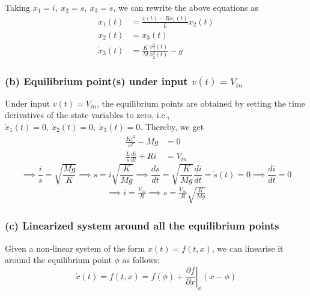 Taking \( x_1 = i, \ x_2 = s, \ x_3 = \dot s \), we can rewrite the above equations as
\begin{align*}
    \dot x_1(t) & = \frac{v(t) - R x_1(t)}{L} x_2(t)          \\
    \dot x_2(t) & = x_3(t)                                    \\
    \dot x_3(t) & = \frac{K}{M} \frac{x_1^2(t)}{x_2^2(t)} - g
\end{align*}

\subsubsection*{(b) Equilibrium point(s) under input \(v(t)=V_{in}\)}

Under input \( v(t)=V_{in} \), the equilibrium points are obtained by setting the time derivatives of the state variables to zero, i.e., \( \dot x_1(t) = 0, \ \dot x_2(t) = 0, \ \dot x_3(t) = 0 \).
Thereby, we get
\begin{align*}
    \frac{Ki^2}{s^2} - Mg         & = 0      \\
    \frac{L}{s}\frac{di}{dt} + Ri & = V_{in}
\end{align*}
\begin{equation*}
    \implies
    \frac{i}{s} = \sqrt{\frac{Mg}{K}}
    \implies
    s = i \sqrt{\frac{K}{Mg}}
    \implies
    \frac{ds}{dt} = \sqrt{\frac{K}{Mg}} \frac{di}{dt} = \dot s(t) = 0
    \implies
    \frac{di}{dt} = 0
\end{equation*}
\begin{align*}
    \implies
    i = \frac{V_{in}}{R}
    \implies
    \boxed{
        s = \frac{V_{in}}{R} \sqrt{\frac{K}{Mg}}
    }
\end{align*}

\subsubsection*{(c) Linearized system around all the equilibrium points}

Given a non-linear system of the form \( \dot x(t) = f(t, x) \), we can linearise it around the equilibrium point \( \phi \) as follows:
\[
    \dot x(t) = f(t, x) = f(\phi) + \left. \frac{\partial f}{\partial x} \right|_{\phi} (x - \phi)
\]
